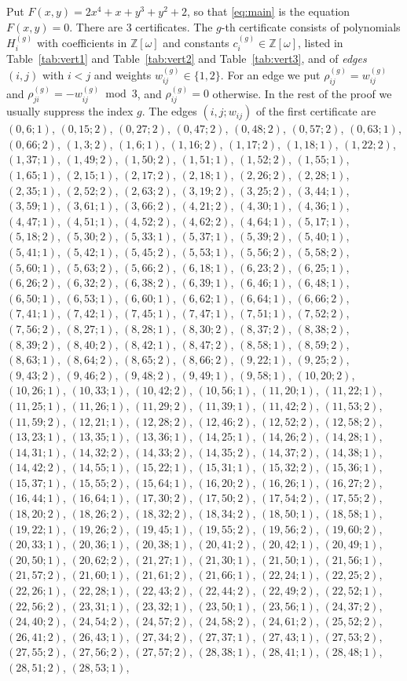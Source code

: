 \documentclass[11pt]{article}
\newcommand{\Z}{\mathbb{Z}}
\begin{document}
Put $F(x,y)=2x^{4}+x+y^{3}+y^{2}+2$, so that \eqref{eq:main} is the equation $F(x,y)=0$. There are 3 certificates. The $g$-th certificate consists of polynomials $H^{(g)}_i$ with coefficients in $\Z[\omega]$ and constants $c^{(g)}_i\in\Z[\omega]$, listed in Table~\ref{tab:vert1} and Table~\ref{tab:vert2} and Table~\ref{tab:vert3}, and of \emph{edges} $(i,j)$ with $i<j$ and weights $w^{(g)}_{ij}\in\{1,2\}$. For an edge we put $\rho^{(g)}_{ij}=w^{(g)}_{ij}$ and $\rho^{(g)}_{ji}=-w^{(g)}_{ij}\bmod3$, and $\rho^{(g)}_{ij}=0$ otherwise. In the rest of the proof we usually suppress the index $g$.
The edges $(i,j;w_{ij})$ of the first certificate are $(0,6;1)$, $(0,15;2)$, $(0,27;2)$, $(0,47;2)$, $(0,48;2)$, $(0,57;2)$, $(0,63;1)$, $(0,66;2)$, $(1,3;2)$, $(1,6;1)$, $(1,16;2)$, $(1,17;2)$, $(1,18;1)$, $(1,22;2)$, $(1,37;1)$, $(1,49;2)$, $(1,50;2)$, $(1,51;1)$, $(1,52;2)$, $(1,55;1)$, $(1,65;1)$, $(2,15;1)$, $(2,17;2)$, $(2,18;1)$, $(2,26;2)$, $(2,28;1)$, $(2,35;1)$, $(2,52;2)$, $(2,63;2)$, $(3,19;2)$, $(3,25;2)$, $(3,44;1)$, $(3,59;1)$, $(3,61;1)$, $(3,66;2)$, $(4,21;2)$, $(4,30;1)$, $(4,36;1)$, $(4,47;1)$, $(4,51;1)$, $(4,52;2)$, $(4,62;2)$, $(4,64;1)$, $(5,17;1)$, $(5,18;2)$, $(5,30;2)$, $(5,33;1)$, $(5,37;1)$, $(5,39;2)$, $(5,40;1)$, $(5,41;1)$, $(5,42;1)$, $(5,45;2)$, $(5,53;1)$, $(5,56;2)$, $(5,58;2)$, $(5,60;1)$, $(5,63;2)$, $(5,66;2)$, $(6,18;1)$, $(6,23;2)$, $(6,25;1)$, $(6,26;2)$, $(6,32;2)$, $(6,38;2)$, $(6,39;1)$, $(6,46;1)$, $(6,48;1)$, $(6,50;1)$, $(6,53;1)$, $(6,60;1)$, $(6,62;1)$, $(6,64;1)$, $(6,66;2)$, $(7,41;1)$, $(7,42;1)$, $(7,45;1)$, $(7,47;1)$, $(7,51;1)$, $(7,52;2)$, $(7,56;2)$, $(8,27;1)$, $(8,28;1)$, $(8,30;2)$, $(8,37;2)$, $(8,38;2)$, $(8,39;2)$, $(8,40;2)$, $(8,42;1)$, $(8,47;2)$, $(8,58;1)$, $(8,59;2)$, $(8,63;1)$, $(8,64;2)$, $(8,65;2)$, $(8,66;2)$, $(9,22;1)$, $(9,25;2)$, $(9,43;2)$, $(9,46;2)$, $(9,48;2)$, $(9,49;1)$, $(9,58;1)$, $(10,20;2)$, $(10,26;1)$, $(10,33;1)$, $(10,42;2)$, $(10,56;1)$, $(11,20;1)$, $(11,22;1)$, $(11,25;1)$, $(11,26;1)$, $(11,29;2)$, $(11,39;1)$, $(11,42;2)$, $(11,53;2)$, $(11,59;2)$, $(12,21;1)$, $(12,28;2)$, $(12,46;2)$, $(12,52;2)$, $(12,58;2)$, $(13,23;1)$, $(13,35;1)$, $(13,36;1)$, $(14,25;1)$, $(14,26;2)$, $(14,28;1)$, $(14,31;1)$, $(14,32;2)$, $(14,33;2)$, $(14,35;2)$, $(14,37;2)$, $(14,38;1)$, $(14,42;2)$, $(14,55;1)$, $(15,22;1)$, $(15,31;1)$, $(15,32;2)$, $(15,36;1)$, $(15,37;1)$, $(15,55;2)$, $(15,64;1)$, $(16,20;2)$, $(16,26;1)$, $(16,27;2)$, $(16,44;1)$, $(16,64;1)$, $(17,30;2)$, $(17,50;2)$, $(17,54;2)$, $(17,55;2)$, $(18,20;2)$, $(18,26;2)$, $(18,32;2)$, $(18,34;2)$, $(18,50;1)$, $(18,58;1)$, $(19,22;1)$, $(19,26;2)$, $(19,45;1)$, $(19,55;2)$, $(19,56;2)$, $(19,60;2)$, $(20,33;1)$, $(20,36;1)$, $(20,38;1)$, $(20,41;2)$, $(20,42;1)$, $(20,49;1)$, $(20,50;1)$, $(20,62;2)$, $(21,27;1)$, $(21,30;1)$, $(21,50;1)$, $(21,56;1)$, $(21,57;2)$, $(21,60;1)$, $(21,61;2)$, $(21,66;1)$, $(22,24;1)$, $(22,25;2)$, $(22,26;1)$, $(22,28;1)$, $(22,43;2)$, $(22,44;2)$, $(22,49;2)$, $(22,52;1)$, $(22,56;2)$, $(23,31;1)$, $(23,32;1)$, $(23,50;1)$, $(23,56;1)$, $(24,37;2)$, $(24,40;2)$, $(24,54;2)$, $(24,57;2)$, $(24,58;2)$, $(24,61;2)$, $(25,52;2)$, $(26,41;2)$, $(26,43;1)$, $(27,34;2)$, $(27,37;1)$, $(27,43;1)$, $(27,53;2)$, $(27,55;2)$, $(27,56;2)$, $(27,57;2)$, $(28,38;1)$, $(28,41;1)$, $(28,48;1)$, $(28,51;2)$, $(28,53;1)$, 
\end{document}
